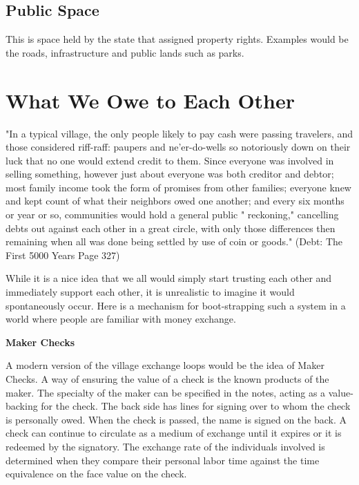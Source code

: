 \documentclass{article}
\begin{document}
\subsection{Public Space} This is space held by the state that assigned property rights. Examples would be the roads, infrastructure and public lands such as parks. 



\pagebreak
{\section{What We Owe to Each Other}}


	
\begin{minipage}[t]{0.66\textwidth}
	\vspace{0pt}
	"In a typical village, the only people likely to pay cash were passing
	travelers, and those considered riff-raff: paupers and ne'er-do-wells so
	notoriously down on their luck that no one would extend credit to
	them. Since everyone was involved in selling something, however just
	about everyone was both creditor and debtor; most family income took
	the form of promises from other families; everyone knew and kept
	count of what their neighbors owed one another; and every six months
	or year or so, communities would hold a general public " reckoning,"
	cancelling debts out against each other in a great circle, with only those
	differences then remaining when all was done being settled by use of
	coin or goods." (Debt: The First 5000 Years Page 327)
	
	\vspace{0.2cm}
	
	While it is a nice idea that we all would simply start trusting each other and immediately support each other, it is unrealistic to imagine it would spontaneously occur. Here is a mechanism for boot-strapping such a system in a world where people are familiar with money exchange. 
	
{\centering \textbf{Maker Checks}\par}
	
	A modern version of the village exchange loops would be the idea of Maker Checks. A way of ensuring the value of a check is the known products of the maker. The specialty of the maker can be specified in the notes, acting as a value-backing for the check. The back side has lines for signing over to whom the check is personally owed. When the check is passed, the name is signed on the back. A check can continue to circulate as a medium of exchange until it expires or it is redeemed by the signatory. The exchange rate of the individuals involved is determined when they compare their personal labor time against the time equivalence on the face value on the check.
	

\end{minipage}
\end{document}
